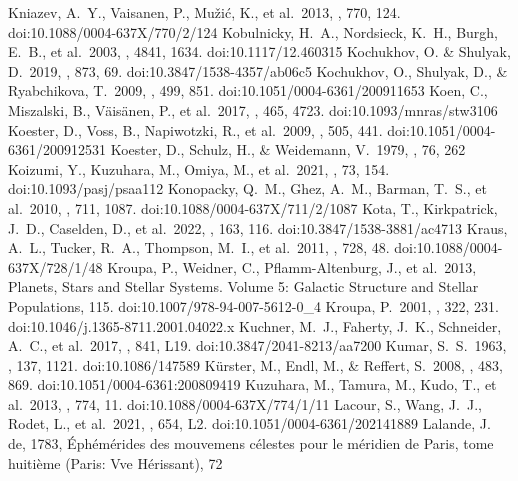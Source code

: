 \documentclass[twocolumn,tighten,twocolappendix]{aastex631}
\begin{document}
\begin{thebibliography}{}
 Kniazev, A.~Y., Vaisanen, P., Mu{\v{z}}i{\'c}, K., et al.\ 2013, \apj, 770, 124. doi:10.1088/0004-637X/770/2/124
 Kobulnicky, H.~A., Nordsieck, K.~H., Burgh, E.~B., et al.\ 2003, \procspie, 4841, 1634. doi:10.1117/12.460315
 Kochukhov, O. \& Shulyak, D.\ 2019, \apj, 873, 69. doi:10.3847/1538-4357/ab06c5
 Kochukhov, O., Shulyak, D., \& Ryabchikova, T.\ 2009, \aap, 499, 851. doi:10.1051/0004-6361/200911653
 Koen, C., Miszalski, B., V{\"a}is{\"a}nen, P., et al.\ 2017, \mnras, 465, 4723. doi:10.1093/mnras/stw3106
 Koester, D., Voss, B., Napiwotzki, R., et al.\ 2009, \aap, 505, 441. doi:10.1051/0004-6361/200912531
 Koester, D., Schulz, H., \& Weidemann, V.\ 1979, \aap, 76, 262
 Koizumi, Y., Kuzuhara, M., Omiya, M., et al.\ 2021, \pasj, 73, 154. doi:10.1093/pasj/psaa112
 Konopacky, Q.~M., Ghez, A.~M., Barman, T.~S., et al.\ 2010, \apj, 711, 1087. doi:10.1088/0004-637X/711/2/1087
 Kota, T., Kirkpatrick, J.~D., Caselden, D., et al.\ 2022, \aj, 163, 116. doi:10.3847/1538-3881/ac4713
 Kraus, A.~L., Tucker, R.~A., Thompson, M.~I., et al.\ 2011, \apj, 728, 48. doi:10.1088/0004-637X/728/1/48
 Kroupa, P., Weidner, C., Pflamm-Altenburg, J., et al.\ 2013, Planets, Stars and Stellar Systems. Volume 5: Galactic Structure and Stellar Populations, 115. doi:10.1007/978-94-007-5612-0\_4
 Kroupa, P.\ 2001, \mnras, 322, 231. doi:10.1046/j.1365-8711.2001.04022.x
 Kuchner, M.~J., Faherty, J.~K., Schneider, A.~C., et al.\ 2017, \apjl, 841, L19. doi:10.3847/2041-8213/aa7200
 Kumar, S.~S.\ 1963, \apj, 137, 1121. doi:10.1086/147589
 K{\"u}rster, M., Endl, M., \& Reffert, S.\ 2008, \aap, 483, 869. doi:10.1051/0004-6361:200809419
 Kuzuhara, M., Tamura, M., Kudo, T., et al.\ 2013, \apj, 774, 11. doi:10.1088/0004-637X/774/1/11
 Lacour, S., Wang, J.~J., Rodet, L., et al.\ 2021, \aap, 654, L2. doi:10.1051/0004-6361/202141889
 Lalande, J. de, 1783, {\'E}ph{\'e}m{\'e}rides des mouvemens c{\'e}lestes pour le m{\'e}ridien de Paris, tome huiti{\`e}me (Paris: Vve H{\'e}rissant), 72

\end{thebibliography}
\end{document}
